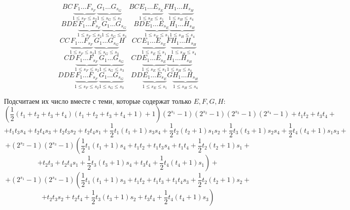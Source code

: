 \documentclass[12pt,a4paper,oneside,fleqn,leqno]{article}
\theoremstyle{definition}
\begin{document}
		$$
			BC\underbrace{F_1\ldots F_{s_F}}_{1\leqslant s_F \leqslant s_2}\underbrace{G_1\ldots G_{s_G}}_{1\leqslant s_G \leqslant s_3}\quad BC\underbrace{E_1\ldots E_{s_E}}_{1\leqslant s_E \leqslant s_1}F\underbrace{H_1\ldots H_{s_H}}_{1\leqslant s_H \leqslant s_4}
		$$
		$$
BDE\underbrace{F_1\ldots F_{s_F}}_{1\leqslant s_F \leqslant s_2}\underbrace{G_1\ldots G_{s_G}}_{1\leqslant s_G \leqslant s_3}\quad BD\underbrace{E_1\ldots E_{s_E}}_{1\leqslant s_E \leqslant s_1}\underbrace{H_1\ldots H_{s_H}}_{1\leqslant s_H \leqslant s_4}
		$$
		$$
			CC\underbrace{F_1\ldots F_{s_F}}_{1\leqslant s_F \leqslant s_2}\underbrace{G_1\ldots G_{s_G}}_{1\leqslant s_G \leqslant s_3}H\quad CC\underbrace{E_1\ldots E_{s_E}}_{1\leqslant s_E \leqslant s_1}F\underbrace{H_1\ldots H_{s_H}}_{1\leqslant s_H \leqslant s_4}
		$$
		$$
			CD\underbrace{F_1\ldots F_{s_F}}_{1\leqslant s_F \leqslant s_2}\underbrace{G_1\ldots G_{s_G}}_{1\leqslant s_G \leqslant s_3}\quad CD\underbrace{E_1\ldots E_{s_E}}_{1\leqslant s_E \leqslant s_1}\underbrace{H_1\ldots H_{s_H}}_{1\leqslant s_H \leqslant s_4}
		$$
		$$
			DDE\underbrace{F_1\ldots F_{s_F}}_{1\leqslant s_F \leqslant s_2}\underbrace{G_1\ldots G_{s_G}}_{1\leqslant s_G \leqslant s_3}\quad DD\underbrace{E_1\ldots E_{s_E}}_{1\leqslant s_E \leqslant s_1}G\underbrace{H_1\ldots H_{s_H}}_{1\leqslant s_H \leqslant s_4}
		$$\par
		Подсчитаем их число вместе с теми, которые содержат только $E, F, G, H$:
		$$
			\left(\frac{1}{2} (t_1 + t_2 + t_3 + t_4)(t_1 + t_2 + t_3 + t_4 + 1) + 1\right)(2^{s_1} - 1)(2^{s_2} - 1)(2^{s_3} - 1)(2^{s_4} - 1) + t_1t_2 + t_3t_4 + 
		$$
		$$
			+ t_1t_3s_4 + t_2t_4s_3 + t_2t_3s_2 + t_2t_4s_1 + \frac{1}{2}t_1(t_1 + 1)s_3s_4 + \frac{1}{2}t_2(t_2 + 1)s_1s_2 + \frac{1}{2}t_3(t_3 + 1)s_2s_4 +\frac{1}{2}t_4(t_4 + 1)s_1s_3 +
		$$
		$$
			+ (2^{s_2} - 1)(2^{s_3} - 1) \left (\frac{1}{2}t_1(t_1 + 1)s_4 + t_1t_2 + t_1t_3s_4 + t_1t_4 +\frac{1}{2}t_2(t_2 + 1)s_1 + \right.$$ $$ \left.+ t_2t_3 + t_2t_4s_1 + \frac{1}{2}t_3(t_3 + 1)s_4 + t_3t_4 + \frac{1}{2}t_4(t_4 + 1)s_1\right) +
		$$
		$$
			+ (2^{s_1} - 1)(2^{s_4} - 1) \left (\frac{1}{2}t_1(t_1 + 1)s_3 + t_1t_2 + t_1t_3 + t_1t_4s_3 + \frac{1}{2}t_2(t_2 + 1)s_2 + \right.$$ $$ \left.+ t_2t_3s_2 + t_2t_4 + \frac{1}{2}t_3(t_3 + 1)s_2 + t_3t_4 + \frac{1}{2}t_4(t_4 + 1)s_3\right)
		$$
\end{document}
